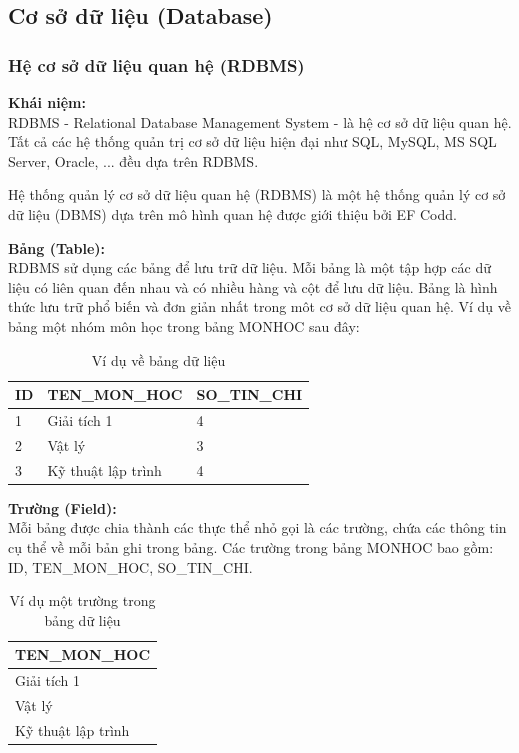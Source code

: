 \subsection{Cơ sở dữ liệu (Database)}
\subsubsection{Hệ cơ sở dữ liệu quan hệ (RDBMS)}
\textbf{Khái niệm:}\\

RDBMS - Relational Database Management System - là hệ cơ sở dữ liệu quan hệ. Tất cả các hệ thống quản trị cơ sở dữ liệu hiện đại như SQL, MySQL, MS SQL Server, Oracle, ... đều dựa trên RDBMS.

Hệ thống quản lý cơ sở dữ liệu quan hệ (RDBMS) là một hệ thống quản lý cơ sở dữ liệu (DBMS) dựa trên mô hình quan hệ được giới thiệu bởi EF Codd.

\textbf{Bảng (Table):}\\

RDBMS sử dụng các bảng để lưu trữ dữ liệu. Mỗi bảng là một tập hợp các dữ liệu có liên quan đến nhau và có nhiều hàng và cột để lưu dữ liệu. Bảng là hình thức lưu trữ phổ biến và đơn giản nhất trong môt cơ sở dữ liệu quan hệ. Ví dụ về bảng một nhóm môn học trong bảng MONHOC sau đây:\\
\begin{table}[H]
    \centering
    \begin{tabular}{|l|l|l|}
    \hline
         \textbf{ID}&\textbf{TEN\_MON\_HOC}&\textbf{SO\_TIN\_CHI}\\
         \hline
         1&Giải tích 1&4\\
		\hline
		2&Vật lý&3\\
		\hline			
		3&Kỹ thuật lập trình&4\\
		\hline
    \end{tabular}
    \caption{Ví dụ về bảng dữ liệu}
\end{table}

\textbf{Trường (Field):}\\
	
	Mỗi bảng được chia thành các thực thể nhỏ gọi là các trường, chứa các thông tin cụ thể về mỗi bản ghi trong bảng. Các trường trong bảng MONHOC bao gồm: ID, TEN\_MON\_HOC, SO\_TIN\_CHI.\\
	\begin{table}[H]
	    \centering
	    \begin{tabular}{|l|}
	        \hline
	        \textbf{TEN\_MON\_HOC}\\
	        \hline
	        Giải tích 1\\
	        \hline
	        Vật lý\\
	        \hline
	        Kỹ thuật lập trình\\
	        \hline
	    \end{tabular}
	    \caption{Ví dụ một trường trong bảng dữ liệu}
	\end{table}
	
